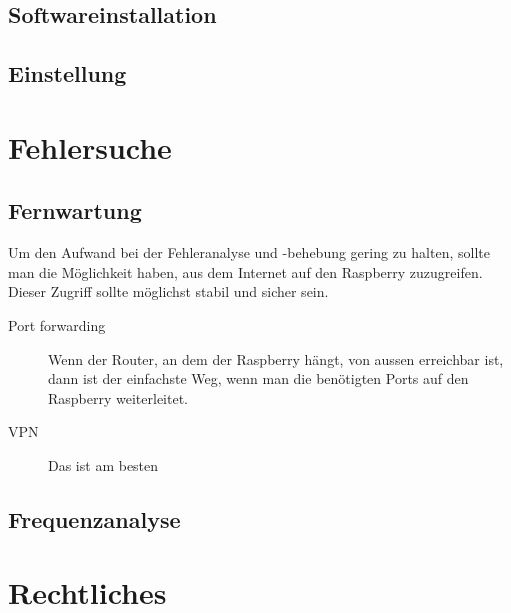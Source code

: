 \documentclass[a4paper]{article}
\begin{document}
\subsection{Softwareinstallation}
\subsection{Einstellung}



\section{Fehlersuche}
\subsection{Fernwartung}
Um den Aufwand bei der Fehleranalyse und -behebung gering zu halten, sollte man die Möglichkeit haben, aus dem Internet auf den Raspberry zuzugreifen. Dieser Zugriff sollte möglichst stabil und sicher sein.
\begin{description}
\item[Port forwarding] Wenn der Router, an dem der Raspberry hängt, von aussen erreichbar ist, dann ist der einfachste Weg, wenn man die benötigten Ports auf den Raspberry weiterleitet.
\item[VPN] Das ist am besten 
\end{description}
\subsection{Frequenzanalyse}

\section{Rechtliches}
\end{document}
